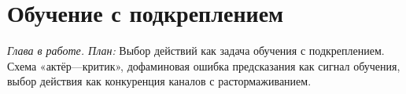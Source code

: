 \chapter{Обучение с подкреплением}
\label{sec:reinforcement}

\emph{Глава в работе. План:} Выбор действий как задача обучения с подкреплением. Схема «актёр---критик», дофаминовая ошибка предсказания как сигнал обучения, выбор действия как конкуренция каналов с растормаживанием.
